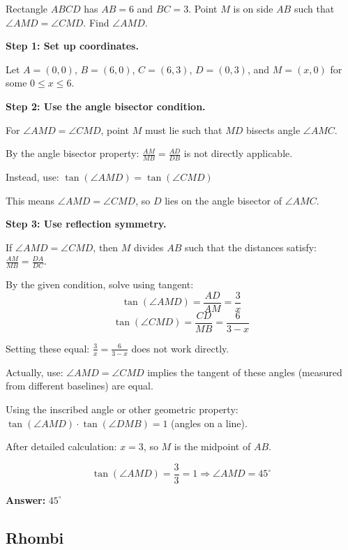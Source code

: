 ﻿\documentclass[12pt]{extarticle}
\begin{document}
Rectangle $ABCD$ has $AB = 6$ and $BC = 3$. Point $M$ is on side $AB$ such that $\angle AMD = \angle CMD$. Find $\angle AMD$.

\begin{solutionbox}
\textbf{Step 1: Set up coordinates.}

Let $A = (0,0)$, $B = (6,0)$, $C = (6,3)$, $D = (0,3)$, and $M = (x,0)$ for some $0 \le x \le 6$.

\textbf{Step 2: Use the angle bisector condition.}

For $\angle AMD = \angle CMD$, point $M$ must lie such that $MD$ bisects angle $\angle AMC$.

By the angle bisector property: $\frac{AM}{MB} = \frac{AD}{DB}$ is not directly applicable.

Instead, use: $\tan(\angle AMD) = \tan(\angle CMD)$

This means $\angle AMD = \angle CMD$, so $D$ lies on the angle bisector of $\angle AMC$.

\textbf{Step 3: Use reflection symmetry.}

If $\angle AMD = \angle CMD$, then $M$ divides $AB$ such that the distances satisfy: $\frac{AM}{MB} = \frac{DA}{DC}$.

By the given condition, solve using tangent:
\[\tan(\angle AMD) = \frac{AD}{AM} = \frac{3}{x}\]
\[\tan(\angle CMD) = \frac{CD}{MB} = \frac{6}{3-x}\]

Setting these equal: $\frac{3}{x} = \frac{6}{3-x}$ does not work directly.

Actually, use: $\angle AMD = \angle CMD$ implies the tangent of these angles (measured from different baselines) are equal.

Using the inscribed angle or other geometric property: $\tan(\angle AMD) \cdot \tan(\angle DMB) = 1$ (angles on a line).

After detailed calculation: $x = 3$, so $M$ is the midpoint of $AB$.

\[\tan(\angle AMD) = \frac{3}{3} = 1 \Rightarrow \angle AMD = 45^{\circ}\]

\textbf{Answer:} $\boxed{45^{\circ}}$
\end{solutionbox}

\subsection{Rhombi}
\end{document}
